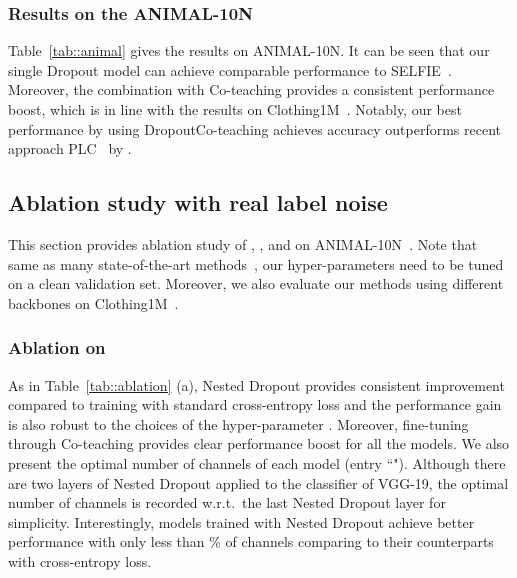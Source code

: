 \documentclass[journal]{IEEEtran}
\begin{document}
\subsubsection{Results on the ANIMAL-10N~\cite{song2019selfie}} 
Table~\ref{tab::animal} gives the results on ANIMAL-10N. 
It can be seen that our single Dropout model can achieve comparable performance to SELFIE~\cite{song2019selfie}.
Moreover, the combination with Co-teaching provides a consistent performance boost, which is in line with the results on Clothing1M~\cite{xiao2015learning}. 
Notably, our best performance by using DropoutCo-teaching achieves  accuracy outperforms recent approach PLC~\cite{zhang2021learning} by . 


\subsection{Ablation study with real label noise}
\label{sec::ablation}
This section provides ablation study of , , and  on ANIMAL-10N~\cite{song2019selfie}. 
Note that same as many state-of-the-art methods~\cite{song2019selfie,li2020dividemix,liu2020early,li2019learning}, our hyper-parameters need to be tuned on a clean validation set.
Moreover, we also evaluate our methods using different backbones on Clothing1M~\cite{xiao2015learning}.

\subsubsection{Ablation on }
As in Table~\ref{tab::ablation} (a), Nested Dropout provides consistent improvement compared to training with standard cross-entropy loss and the performance gain is also robust to the choices of the hyper-parameter . 
Moreover, fine-tuning through Co-teaching provides clear performance boost for all the models. 
We also present the optimal number of channels of each model (entry ``"). 
Although there are two layers of Nested Dropout applied to the classifier of VGG-19, the optimal number of channels  is recorded w.r.t.~the last Nested Dropout layer for simplicity.
Interestingly, models trained with Nested Dropout achieve better performance with only less than \% of channels comparing to their counterparts with cross-entropy loss.
\end{document}
